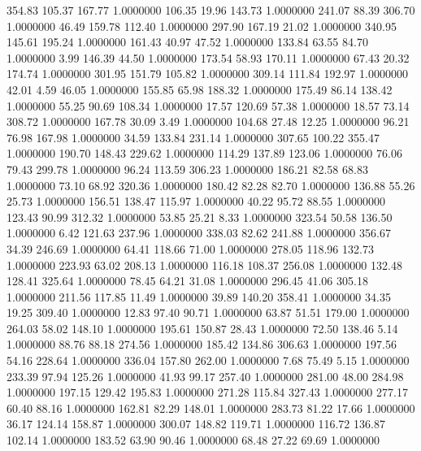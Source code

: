 354.83  105.37  167.77   1.0000000
 106.35   19.96  143.73   1.0000000
 241.07   88.39  306.70   1.0000000
  46.49  159.78  112.40   1.0000000
 297.90  167.19   21.02   1.0000000
 340.95  145.61  195.24   1.0000000
 161.43   40.97   47.52   1.0000000
 133.84   63.55   84.70   1.0000000
   3.99  146.39   44.50   1.0000000
 173.54   58.93  170.11   1.0000000
  67.43   20.32  174.74   1.0000000
 301.95  151.79  105.82   1.0000000
 309.14  111.84  192.97   1.0000000
  42.01    4.59   46.05   1.0000000
 155.85   65.98  188.32   1.0000000
 175.49   86.14  138.42   1.0000000
  55.25   90.69  108.34   1.0000000
  17.57  120.69   57.38   1.0000000
  18.57   73.14  308.72   1.0000000
 167.78   30.09    3.49   1.0000000
 104.68   27.48   12.25   1.0000000
  96.21   76.98  167.98   1.0000000
  34.59  133.84  231.14   1.0000000
 307.65  100.22  355.47   1.0000000
 190.70  148.43  229.62   1.0000000
 114.29  137.89  123.06   1.0000000
  76.06   79.43  299.78   1.0000000
  96.24  113.59  306.23   1.0000000
 186.21   82.58   68.83   1.0000000
  73.10   68.92  320.36   1.0000000
 180.42   82.28   82.70   1.0000000
 136.88   55.26   25.73   1.0000000
 156.51  138.47  115.97   1.0000000
  40.22   95.72   88.55   1.0000000
 123.43   90.99  312.32   1.0000000
  53.85   25.21    8.33   1.0000000
 323.54   50.58  136.50   1.0000000
   6.42  121.63  237.96   1.0000000
 338.03   82.62  241.88   1.0000000
 356.67   34.39  246.69   1.0000000
  64.41  118.66   71.00   1.0000000
 278.05  118.96  132.73   1.0000000
 223.93   63.02  208.13   1.0000000
 116.18  108.37  256.08   1.0000000
 132.48  128.41  325.64   1.0000000
  78.45   64.21   31.08   1.0000000
 296.45   41.06  305.18   1.0000000
 211.56  117.85   11.49   1.0000000
  39.89  140.20  358.41   1.0000000
  34.35   19.25  309.40   1.0000000
  12.83   97.40   90.71   1.0000000
  63.87   51.51  179.00   1.0000000
 264.03   58.02  148.10   1.0000000
 195.61  150.87   28.43   1.0000000
  72.50  138.46    5.14   1.0000000
  88.76   88.18  274.56   1.0000000
 185.42  134.86  306.63   1.0000000
 197.56   54.16  228.64   1.0000000
 336.04  157.80  262.00   1.0000000
   7.68   75.49    5.15   1.0000000
 233.39   97.94  125.26   1.0000000
  41.93   99.17  257.40   1.0000000
 281.00   48.00  284.98   1.0000000
 197.15  129.42  195.83   1.0000000
 271.28  115.84  327.43   1.0000000
 277.17   60.40   88.16   1.0000000
 162.81   82.29  148.01   1.0000000
 283.73   81.22   17.66   1.0000000
  36.17  124.14  158.87   1.0000000
 300.07  148.82  119.71   1.0000000
 116.72  136.87  102.14   1.0000000
 183.52   63.90   90.46   1.0000000
  68.48   27.22   69.69   1.0000000
